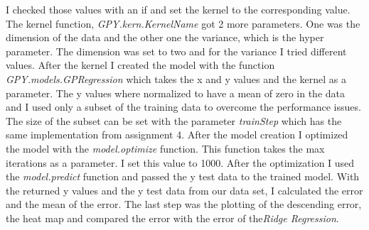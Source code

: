 \documentclass[10pt, a4paper, twocolumn]{article} %
\begin{document}
I checked those values with an if and set the kernel to the corresponding value.
The kernel function, \textit{GPY.kern.KernelName} got 2 more parameters. One was the dimension of the data and the other one the variance, which is the hyper parameter. The dimension was set to two and for the variance I tried different values. After the kernel I created the model with the function \textit{GPY.models.GPRegression} which takes the x and y values and the kernel as a parameter. The y values where normalized to have a mean of zero in the data and I used only a subset of the training data to overcome the performance issues. The size of the subset can be set with the parameter \textit{trainStep} which has the same implementation from assignment 4. After the model creation I optimized the model with the \textit{model.optimize} function. This function takes the max iterations as a parameter. I set this value to 1000. After the optimization I used the \textit{model.predict} function and passed the y test data to the trained model. With the returned y values and the y test data from our data set, I calculated the error and the mean of the error. The last step was the plotting of the descending error, the heat map and compared the error with the error of the\textit{Ridge Regression}.
\end{document}
